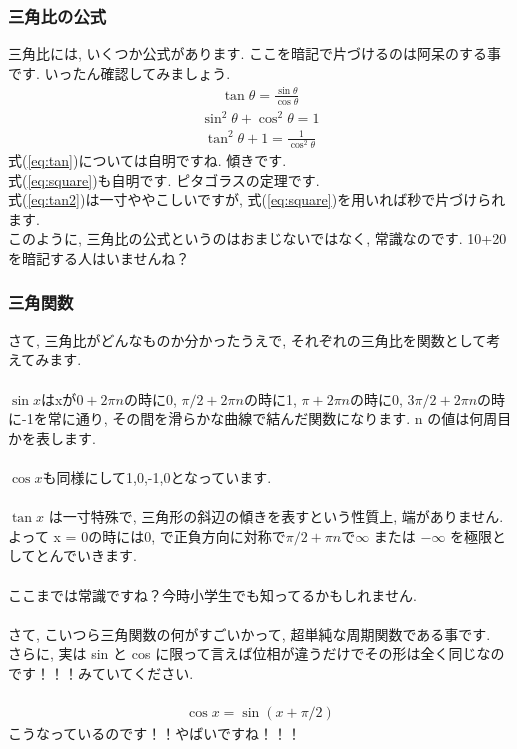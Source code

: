 \documentclass[11pt,a4paper]{jsarticle}
\begin{document}
\subsubsection{三角比の公式}
三角比には, いくつか公式があります. ここを暗記で片づけるのは阿呆のする事です. いったん確認してみましょう.
\begin{eqnarray}
\tan \theta = \frac{\sin\theta}{\cos\theta}
\label{eq:tan}
\end{eqnarray}
\begin{eqnarray}
\sin^2 \theta + \cos^2\theta = 1
\label{eq:square}
\end{eqnarray}
\begin{eqnarray}
\tan^2\theta + 1 = \frac{1}{\cos^2\theta}
\label{eq:tan2}
\end{eqnarray}
式(\ref{eq:tan})については自明ですね. 傾きです.\\
式(\ref{eq:square})も自明です. ピタゴラスの定理です.\\
式(\ref{eq:tan2})は一寸ややこしいですが, 式(\ref{eq:square})を用いれば秒で片づけられます. \\
このように, 三角比の公式というのはおまじないではなく, 常識なのです. 10+20を暗記する人はいませんね？\\



\subsubsection{三角関数}
さて, 三角比がどんなものか分かったうえで, それぞれの三角比を関数として考えてみます.\\
\\
 $\sin x $はxが$0 + 2\pi n$の時に0, $\pi/2 + 2\pi n$の時に1, $\pi + 2\pi n$の時に0, $3\pi/2 + 2\pi n$の時に-1を常に通り, その間を滑らかな曲線で結んだ関数になります. n の値は何周目かを表します.\\
\\
$\cos x $も同様にして1,0,-1,0となっています. \\
\\
$\tan x$ は一寸特殊で, 三角形の斜辺の傾きを表すという性質上, 端がありません. よって x = 0の時には0, で正負方向に対称で$\pi/2 + \pi n$で$\infty$ または $-\infty$ を極限としてとんでいきます.\\
\\
ここまでは常識ですね？今時小学生でも知ってるかもしれません.\\
\\
さて, こいつら三角関数の何がすごいかって, 超単純な周期関数である事です. \\
さらに, 実は sin と cos に限って言えば位相が違うだけでその形は全く同じなのです！！！みていてください.\\
\\
\begin{eqnarray}
\cos x = \sin (x + \pi/2)
\end{eqnarray}
こうなっているのです！！やばいですね！！！
\\
\end{document}

